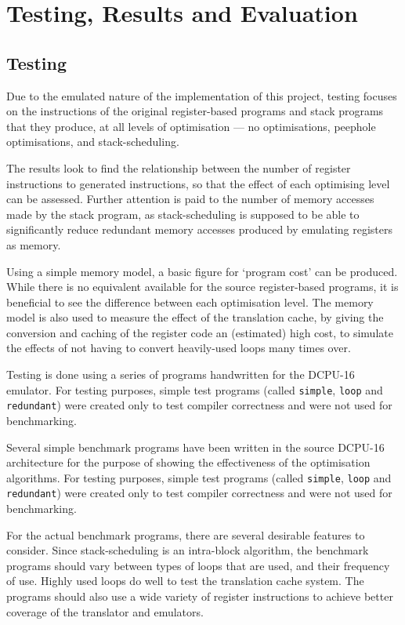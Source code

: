 \chapter{Testing, Results and Evaluation}\label{ch:testingresults}
\section{Testing}

Due to the emulated nature of the implementation of this project, testing
focuses on the instructions of the original register-based programs and stack
programs that they produce, at all levels of optimisation --- no optimisations,
peephole optimisations, and stack-scheduling.

The results look to find the relationship between the number of register
instructions to generated instructions, so that the effect of each optimising
level can be assessed. Further attention is paid to the number of memory
accesses made by the stack program, as stack-scheduling is supposed to be able
to significantly reduce redundant memory accesses produced by emulating
registers as memory.

Using a simple memory model, a basic figure for `program cost' can be produced.
While there is no equivalent available for the source register-based programs,
it is beneficial to see the difference between each optimisation level. The
memory model is also used to measure the effect of the translation cache, by
giving the conversion and caching of the register code an (estimated) high cost,
to simulate the effects of not having to convert heavily-used loops many times
over.

Testing is done using a series of programs handwritten for the DCPU-16
emulator. For testing purposes, simple test programs (called \texttt{simple},
\texttt{loop} and \texttt{redundant}) were created only to test compiler
correctness and were not used for benchmarking.

Several simple benchmark programs have been written in the source DCPU-16
architecture for the purpose of showing the effectiveness of the optimisation
algorithms. For testing purposes, simple test programs (called \texttt{simple},
\texttt{loop} and \texttt{redundant}) were created only to test compiler
correctness and were not used for benchmarking.

For the actual benchmark programs, there are several desirable features to
consider. Since stack-scheduling is an intra-block algorithm, the benchmark
programs should vary between types of loops that are used, and their frequency
of use. Highly used loops do well to test the translation cache system. The
programs should also use a wide variety of register instructions to achieve
better coverage of the translator and emulators.

